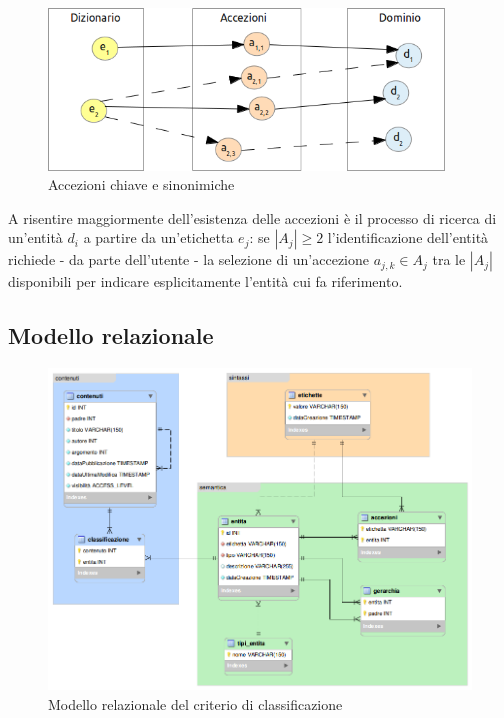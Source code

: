 \begin{figure}[ht]
	\begin{center}
		\includegraphics[width=10.5cm]{img/accezioni-chiave-sinonimiche.png}
		\caption{Accezioni chiave e sinonimiche}
		\label{fig:tesi:stage:fase-uno:accezioni-chiave-sinonimiche}
	\end{center}
\end{figure}

A risentire maggiormente dell'esistenza delle accezioni è il processo di ricerca di un'entità $d_i$ a partire da un'etichetta $e_j$: se $\left|A_j\right|\geq 2$ l'identificazione dell'entità richiede - da parte dell'utente - la selezione di un'accezione $a_{j,k} \in A_j$ tra le $\left|A_j\right|$ disponibili per indicare esplicitamente l'entità cui fa riferimento.

\subsection{Modello relazionale}

\begin{figure}[ht]
	\begin{center}
		\includegraphics[width=12cm]{img/modello-er.png}
		\caption[Modello relazionale]{Modello relazionale del criterio di classificazione}
		\label{fig:tesi:stage:er:modello}
	\end{center}
\end{figure}


